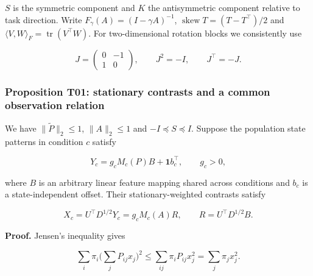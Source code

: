 \documentclass[11pt,a4paper]{article}
\begin{document}
\(S\) is the symmetric component and \(K\) the antisymmetric component
relative to task direction. Write \(F_\gamma(A)=(I-\gamma A)^{-1}\),
\(\operatorname{skew}T=(T-T^\top)/2\) and
\(\langle V,W\rangle_F=\operatorname{tr}(V^\top W)\). For
two-dimensional rotation blocks we consistently use

\[
J=\begin{pmatrix}0&-1\\1&0\end{pmatrix},
\qquad J^2=-I,\qquad J^\top=-J.
\]

\subsubsection{Proposition T01: stationary contrasts and a common
observation
relation}\label{proposition-t01-stationary-contrasts-and-a-common-observation-relation}

\par
\noindent\begin{minipage}{\linewidth}

We have \(\|\widetilde P\|_2\le1\), \(\|A\|_2\le1\) and
\(-I\preceq S\preceq I\). Suppose the population state patterns in
condition \(c\) satisfy

\[
Y_c=g_cM_c(P)B+\mathbf1b_c^\top,\qquad g_c>0,
\]

\end{minipage}\par

\par
\noindent\begin{minipage}{\linewidth}

where \(B\) is an arbitrary linear feature mapping shared across
conditions and \(b_c\) is a state-independent offset. Their
stationary-weighted contrasts satisfy

\[
X_c=U^\top D^{1/2}Y_c=g_cM_c(A)R,
\qquad R=U^\top D^{1/2}B.
\]

\end{minipage}\par

\par
\noindent\begin{minipage}{\linewidth}

\textbf{Proof.} Jensen's inequality gives

\[
\sum_i\pi_i\Big(\sum_jP_{ij}x_j\Big)^2
\le\sum_{ij}\pi_iP_{ij}x_j^2
=\sum_j\pi_jx_j^2.
\]

\end{minipage}\par
\end{document}
